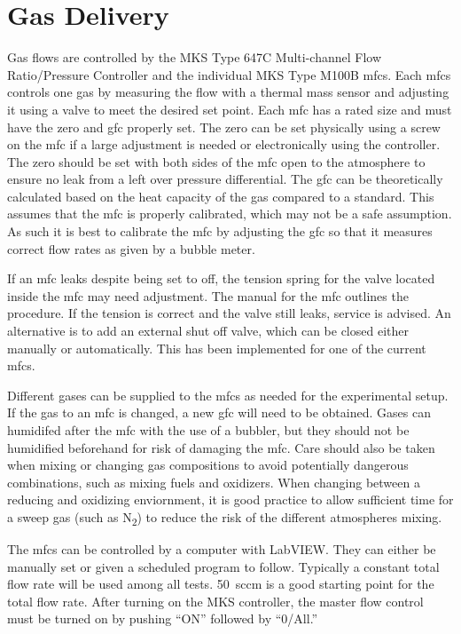 \section{Gas Delivery}
    Gas flows are controlled by the MKS Type 647C Multi-channel Flow Ratio/Pressure Controller and the individual MKS Type M100B \glspl{mfc}.
    Each \glspl{mfc} controls one gas by measuring the flow with a thermal mass sensor and adjusting it using a valve to meet the desired set point.
    Each \gls{mfc} has a rated size and must have the zero and \gls{gfc} properly set.
    The zero can be set physically using a screw on the \gls{mfc} if a large adjustment is needed or electronically using the controller.
    The zero should be set with both sides of the \gls{mfc} open to the atmosphere to ensure no leak from a left over pressure differential.
    The \gls{gfc} can be theoretically calculated based on the heat capacity of the gas compared to a standard.
    This assumes that the \gls{mfc} is properly calibrated, which may not be a safe assumption.
    As such it is best to calibrate the \gls{mfc} by adjusting the \gls{gfc} so that it measures correct flow rates as given by a bubble meter.

    If an \gls{mfc} leaks despite being set to off, the tension spring for the valve located inside the \gls{mfc} may need adjustment.
    The manual for the \gls{mfc} outlines the procedure.
    If the tension is correct and the valve still leaks, service is advised.
    An alternative is to add an external shut off valve, which can be closed either manually or automatically.
    This has been implemented for one of the current \glspl{mfc}.

    Different gases can be supplied to the \glspl{mfc} as needed for the experimental setup.
    If the gas to an \gls{mfc} is changed, a new \gls{gfc} will need to be obtained.
    Gases can humidifed after the \gls{mfc} with the use of a bubbler, but they should not be humidified beforehand for risk of damaging the \gls{mfc}.
    Care should also be taken when mixing or changing gas compositions to avoid potentially dangerous combinations, such as mixing fuels and oxidizers.
    When changing between a reducing and oxidizing enviornment, it is good practice to allow sufficient time for a sweep gas (such as N\textsubscript{2}) to reduce the risk of the different atmospheres mixing.

    The \glspl{mfc} can be controlled by a computer with LabVIEW.
    They can either be manually set or given a scheduled program to follow.
    Typically a constant total flow rate will be used among all tests.
    \SI{50}{sccm} is a good starting point for the total flow rate.
    After turning on the MKS controller, the master flow control must be turned on by pushing ``ON'' followed by ``0/All.''

